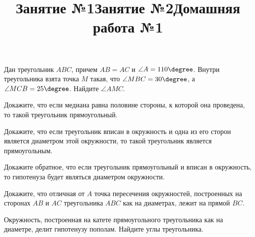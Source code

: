 \title{Занятие №1}
\begin{listofex}
	\item {}
	\item {}
	\item {}
	\item {}
	\item {}
	\item {}
	\item {}
	\item {}
\end{listofex}
\newpage
\title{Занятие №2}
\begin{listofex}
		\item Дан треугольник \( ABC \), причем \( AB = AC \) и \( \angle A = 110\degree \). Внутри треугольника взята точка \( M \) такая, что \( \angle MBC = 30\degree \), а \( \angle MCB = 25\degree \). Найдите \( \angle AMC \).
	\item Докажите, что если медиана равна половине стороны, к которой она проведена, то такой треугольник прямоугольный.
	\item {}
	\item Докажите, что если треугольник вписан в окружность и одна из его сторон является диаметром этой окружности, то такой треугольник является прямоугольным.
	\item Докажите обратное, что если треугольник прямоугольный и вписан в окружность, то гипотенуза будет являться диаметром окружности.
	\item {}
	\item Докажите, что отличная от \( A \) точка пересечения окружностей, построенных на сторонах \( AB \) и \( AC \) треугольника \( ABC \) как на диаметрах, лежит на прямой \( BC \).
	\item Окружность, построенная на катете прямоугольного треугольника как на диаметре, делит гипотенузу пополам. Найдите углы треугольника.
	\item {}
	\item {}
\end{listofex}
\newpage
\title{Домашняя работа №1}
